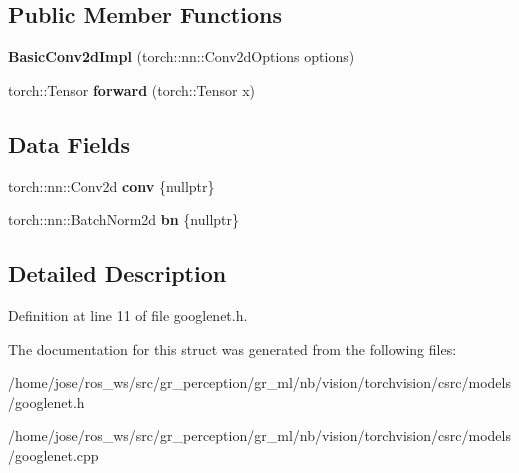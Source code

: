 \subsection*{Public Member Functions}
\begin{DoxyCompactItemize}
\item 
\mbox{\label{structvision_1_1models_1_1__googlenetimpl_1_1BasicConv2dImpl_abf3ad0ee0573d05655bba86729320733}} 
{\bfseries Basic\+Conv2d\+Impl} (torch\+::nn\+::\+Conv2d\+Options options)
\item 
\mbox{\label{structvision_1_1models_1_1__googlenetimpl_1_1BasicConv2dImpl_a945da35d706b36ff76052523a68bdc35}} 
torch\+::\+Tensor {\bfseries forward} (torch\+::\+Tensor x)
\end{DoxyCompactItemize}
\subsection*{Data Fields}
\begin{DoxyCompactItemize}
\item 
\mbox{\label{structvision_1_1models_1_1__googlenetimpl_1_1BasicConv2dImpl_a0043f4f55bc1666eac1d55eb5578d06f}} 
torch\+::nn\+::\+Conv2d {\bfseries conv} \{nullptr\}
\item 
\mbox{\label{structvision_1_1models_1_1__googlenetimpl_1_1BasicConv2dImpl_ac73e86e144d48c82517d516000419823}} 
torch\+::nn\+::\+Batch\+Norm2d {\bfseries bn} \{nullptr\}
\end{DoxyCompactItemize}


\subsection{Detailed Description}


Definition at line 11 of file googlenet.\+h.



The documentation for this struct was generated from the following files\+:\begin{DoxyCompactItemize}
\item 
/home/jose/ros\+\_\+ws/src/gr\+\_\+perception/gr\+\_\+ml/nb/vision/torchvision/csrc/models/googlenet.\+h\item 
/home/jose/ros\+\_\+ws/src/gr\+\_\+perception/gr\+\_\+ml/nb/vision/torchvision/csrc/models/googlenet.\+cpp\end{DoxyCompactItemize}
